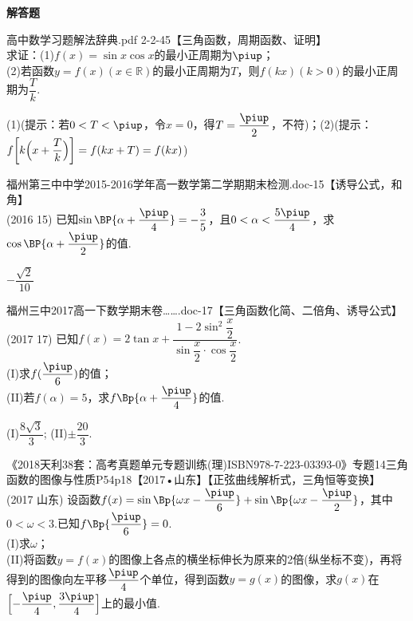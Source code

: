 \begin{exercise}{\bf 解答题}
\begin{answer}
      \end{answer}
    \item 高中数学习题解法辞典.pdf 2-2-45【三角函数，周期函数、证明】\\
      求证：(1)$f(x)=\sin x\cos x$的最小正周期为$\piup$；\\
      (2)若函数$y=f(x)(x\in\mathbb{R})$的最小正周期为$T$，则$f(kx)(k>0)$的最小正周期为$\dfrac{T}k$.
      \begin{answer}
        (1)(提示：若$0<T<\piup$，令$x=0$，得$T=\dfrac{\piup}2$，不符)；(2)(提示：$f\biggl[k\Bigl(x+\dfrac{T}k\Bigr)\biggr]=f(kx+T)=f(kx)$)
      \end{answer}
    \item 福州第三中中学2015-2016学年高一数学第二学期期末检测.doc-15【诱导公式，和角】\\
      (2016  15)
      已知$\sin\BP{\alpha+\dfrac{\piup}4}=-\dfrac35$，且$0<\alpha<\dfrac{5\piup}4$，求$\cos\BP{\alpha+\dfrac{\piup}2}$的值.
      \begin{answer}
        $-\dfrac{\sqrt2}{10}$
      \end{answer}
    \item 福州三中2017高一下数学期末卷…….doc-17【三角函数化简、二倍角、诱导公式】\\
        (2017  17)
        已知$f(x)=2\tan x+\dfrac{1-2\sin^2{\dfrac{x}2}}{\sin\dfrac{x}2\cdot\cos\dfrac{x}2}$.\\
        (I)求$f(\dfrac{\piup}6)$的值；\\
        (II)若$f(\alpha)=5$，求$f\Bp{\alpha+\dfrac{\piup}4}$的值.
        \begin{answer}
          (I)$\dfrac{8\sqrt3}3$;
          (II)$\pm\dfrac{20}3$.
        \end{answer}
    \item 《2018天利38套：高考真题单元专题训练(理)ISBN978-7-223-03393-0》专题14三角函数的图像与性质P54p18【2017•山东】【正弦曲线解析式，三角恒等变换】\\
          {\kaishu (2017 \textbullet 山东)}
          设函数$f(x)=\sin\Bp{\omega x-\dfrac{\piup}6}+\sin\Bp{\omega x-\dfrac{\piup}2}$，其中$0<\omega<3$.已知$f\Bp{\dfrac{\piup}6}=0$.\\
          (I)求$\omega$；\\
          (II)将函数$y=f(x)$的图像上各点的横坐标伸长为原来的2倍(纵坐标不变)，再将得到的图像向左平移$\dfrac{\piup}4$个单位，得到函数$y=g(x)$的图像，求$g(x)$在$\Bigl[-\dfrac{\piup}4,\dfrac{3\piup}4\Bigr]$上的最小值.
          \begin{answer}

\end{answer}
\end{exercise}
